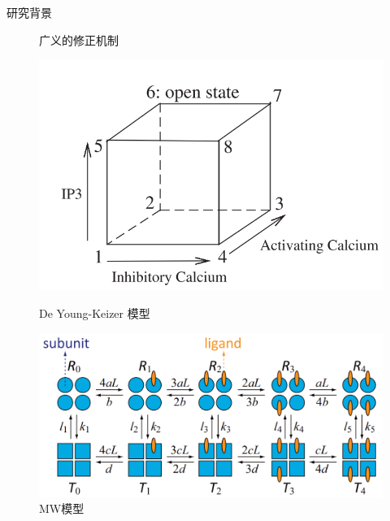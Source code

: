 \documentclass{beamer}
\begin{document}
\begin{frame}{研究背景}
\begin{figure}[h]
\begin{minipage}[t]{0.4\linewidth}
			\caption{广义的修正机制}
		\end{minipage}
	\end{figure}

	\begin{figure}[h]
		\begin{minipage}[t]{0.4\linewidth}
			\centering
			\includegraphics[scale=0.4]{chart/De-Young-Keizer-model.png}
			\caption{De Young-Keizer 模型}
		\end{minipage}
		\begin{minipage}[t]{0.4\linewidth}
			\centering
			\includegraphics[scale=0.4]{chart/MWC.png}
			\caption{MW模型}
		\end{minipage}
	\end{figure}
\end{frame}
\end{document}
